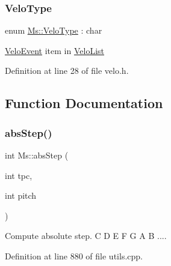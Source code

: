\mbox{\label{namespace_ms_a956ce458826705343340d8d32826e21e}} 
\subsubsection{\texorpdfstring{Velo\+Type}{VeloType}}
{\footnotesize\ttfamily enum \hyperlink{namespace_ms_a956ce458826705343340d8d32826e21e}{Ms\+::\+Velo\+Type} \+: char\hspace{0.3cm}{\ttfamily [strong]}}

\hyperlink{struct_ms_1_1_velo_event}{Velo\+Event} item in \hyperlink{class_ms_1_1_velo_list}{Velo\+List} 

Definition at line 28 of file velo.\+h.



\subsection{Function Documentation}
\mbox{\label{namespace_ms_ae90e08f3e4159d323de2c12cd74865da}} 
\subsubsection{\texorpdfstring{abs\+Step()}{absStep()}}
{\footnotesize\ttfamily int Ms\+::abs\+Step (\begin{DoxyParamCaption}\item[{int}]{tpc,  }\item[{int}]{pitch }\end{DoxyParamCaption})}

Compute absolute step. C D E F G A B .... 

Definition at line 880 of file utils.\+cpp.

\mbox{\label{namespace_ms_ab9a5f9ffb33e7efbe4fd1ab0273bcb2c}} 
